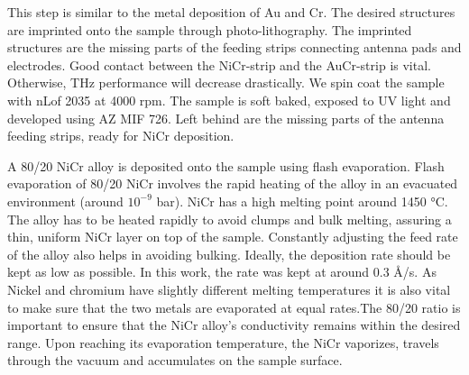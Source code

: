 This step is similar to the metal deposition of Au and Cr. The desired structures are imprinted onto the sample through photo-lithography. The imprinted structures are the missing parts of the feeding strips connecting antenna pads and electrodes. Good contact between the NiCr-strip and the AuCr-strip is vital. Otherwise, THz performance will decrease drastically. We spin coat the sample with nLof 2035 at \num{4000} rpm. The sample is soft baked, exposed to UV light and developed using AZ MIF 726. Left behind are the missing parts of the antenna feeding strips, ready for NiCr deposition.

A \num{80}/\num{20} NiCr alloy is deposited onto the sample using flash evaporation. Flash evaporation of \num{80}/\num{20} NiCr involves the rapid heating of the alloy in an evacuated environment (around $10^{-9}$ \si{\bar}). NiCr has a high melting point around \num{1450} \si{\celsius}. The alloy has to be heated rapidly to avoid clumps and bulk melting, assuring a thin, uniform NiCr layer on top of the sample. Constantly adjusting the feed rate of the alloy also helps in avoiding bulking. Ideally, the deposition rate should be kept as low as possible. In this work, the rate was kept at around \num{0.3} \si{\angstrom}/\si{\s}. As Nickel and chromium have slightly different melting temperatures it is also vital to make sure that the two metals are evaporated at equal rates.The 80/20 ratio is important to ensure that the NiCr alloy’s conductivity remains within the desired range. Upon reaching its evaporation temperature, the NiCr vaporizes, travels through the vacuum and accumulates on the sample surface.

